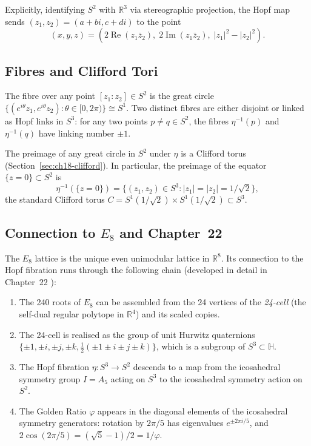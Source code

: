 Explicitly, identifying $S^2$ with $\mathbb{R}^3$ via stereographic projection,
the Hopf map sends $(z_1,z_2) = (a+bi, c+di)$ to the point
\begin{equation}\label{eq:hopf-explicit}
  (x,y,z) = (2\operatorname{Re}(z_1\bar{z}_2),\; 2\operatorname{Im}(z_1\bar{z}_2),\; |z_1|^2 - |z_2|^2).
\end{equation}

\subsection{Fibres and Clifford Tori}\label{subsec:ch18-hopf-fibres}

The fibre over any point $[z_1:z_2] \in S^2$ is the great circle
$\{(e^{i\theta}z_1, e^{i\theta}z_2) : \theta \in [0,2\pi)\} \cong S^1$.
Two distinct fibres are either disjoint or linked as Hopf links in $S^3$:
for any two points $p \ne q \in S^2$, the fibres $\eta^{-1}(p)$ and
$\eta^{-1}(q)$ have linking number $\pm 1$.

The preimage of any great circle in $S^2$ under $\eta$ is a Clifford torus
(Section~\ref{sec:ch18-clifford}).
In particular, the preimage of the equator $\{z = 0\} \subset S^2$ is
\begin{equation}\label{eq:hopf-equator-preimage}
  \eta^{-1}(\{z=0\}) = \{(z_1,z_2) \in S^3 : |z_1| = |z_2| = 1/\sqrt{2}\},
\end{equation}
the standard Clifford torus $C = S^1(1/\sqrt{2}) \times S^1(1/\sqrt{2}) \subset S^3$.

\subsection{Connection to \texorpdfstring{$E_8$}{E8} and Chapter~22}
\label{subsec:ch18-e8}

The $E_8$ lattice is the unique even unimodular lattice in $\mathbb{R}^8$.
Its connection to the Hopf fibration runs through the following chain
(developed in detail in Chapter~22 \cite{ConwaySloane1999}):

\begin{enumerate}
\item The 240 roots of $E_8$ can be assembled from the 24 vertices of the
  \emph{24-cell} (the self-dual regular polytope in $\mathbb{R}^4$) and
  its scaled copies.
\item The 24-cell is realised as the group of unit Hurwitz quaternions
  $\{\pm 1, \pm i, \pm j, \pm k, \tfrac{1}{2}(\pm 1 \pm i \pm j \pm k)\}$,
  which is a subgroup of $S^3 \subset \mathbb{H}$.
\item The Hopf fibration $\eta: S^3 \to S^2$ descends to a map from the
  icosahedral symmetry group $I = A_5$ acting on $S^3$ to the icosahedral
  symmetry action on $S^2$.
\item The Golden Ratio $\varphi$ appears in the diagonal elements of the
  icosahedral symmetry generators: rotation by $2\pi/5$ has eigenvalues
  $e^{\pm 2\pi i/5}$, and $2\cos(2\pi/5) = (\sqrt{5}-1)/2 = 1/\varphi$.
\end{enumerate}

